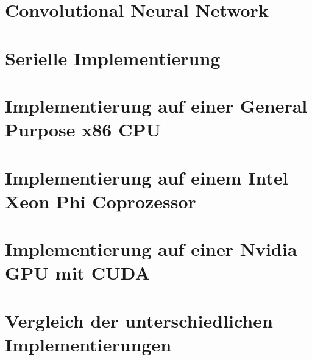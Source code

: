 \documentclass[12pt,oneside, 
liststotoc, 						%
bibtotoc,						%
titlepage, 						%
abstracton,					%
DIV11,						%
BCOR6mm,					%
]{scrreprt}
\begin{document}
\chapter{Convolutional Neural Network}

\clearpage

\chapter{Serielle Implementierung}

\clearpage

\chapter{Implementierung auf einer General Purpose x86 CPU}

\clearpage

\chapter{Implementierung auf einem Intel Xeon Phi Coprozessor}

\clearpage

\chapter{Implementierung auf einer Nvidia GPU mit CUDA} \label{chap:cuda}

\clearpage

\chapter{Vergleich der unterschiedlichen Implementierungen}

\clearpage

\printbibliography
\clearpage
\end{document}
